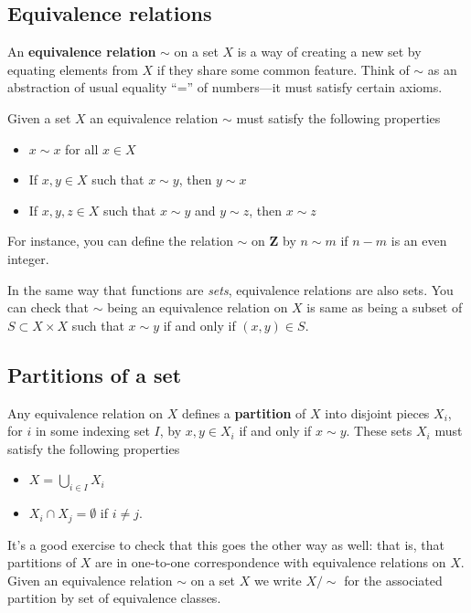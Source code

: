 \documentclass[12pt]{article}
\numberwithin{equation}{subsection}
\theoremstyle{note}
\begin{document}
\subsection{Equivalence relations}
An \textbf{equivalence relation} $\sim$ on a set $X$ is a way of creating a new set by equating elements from $X$ if they share some common feature. Think of $\sim$ as an abstraction of usual equality ``='' of numbers---it must satisfy certain axioms. 

Given a set $X$ an equivalence relation $\sim$ must satisfy the following properties 
\begin{itemize}
	\item $x\sim x$ for all $x\in X$
	\item If $x,y\in X$ such that $x\sim y$, then $y\sim x$
	\item If $x,y,z\in X$ such that $x\sim y$ and $y\sim z$, then $x\sim z$
\end{itemize}

For instance, you can define the relation $\sim$ on $\mathbf{Z}$ by $n\sim m$ if $n-m$ is an even integer. 

In the same way that functions are \textit{sets}, equivalence relations are also sets. You can check that $\sim$ being an equivalence relation on $X$ is same as being a subset of $S\subset X\times X$ such that $x\sim y$ if and only if $(x,y)\in S$. 

\subsection{Partitions of a set} 
Any equivalence relation on $X$ defines a \textbf{partition} of $X$ into disjoint pieces $X_i$, for $i$ in some indexing set $I$, by $x,y\in X_i$ if and only if $x\sim y$. These sets $X_i$ must satisfy the following properties \begin{itemize} 
\item $X=\bigcup_{i\in I} X_i$
\item $X_i\cap X_j=\emptyset$ if $i\neq j$.
\end{itemize}
It's a good exercise to check that this goes the other way as well: that is, that partitions of $X$ are in one-to-one correspondence with equivalence relations on $X$. Given an equivalence relation $\sim$ on a set $X$ we write $X/\sim$ for the associated partition by set of equivalence classes. 
\end{document}
